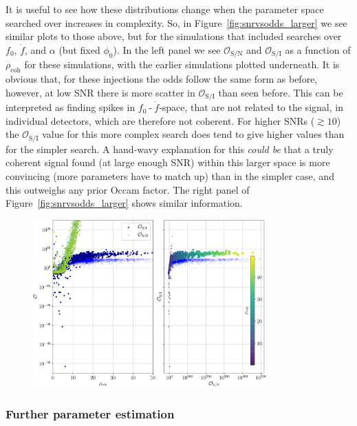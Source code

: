 It is useful to see how these distributions change when the parameter space searched over increases in complexity. So, in Figure~\ref{fig:snrvsodds_larger}
we see similar plots to those above, but for the simulations that included searches over $f_0$, $\dot{f}$, and $\alpha$ (but fixed $\phi_0$). In the left
panel we see $\mathcal{O}_{\text{S}/\text{N}}$ and $\mathcal{O}_{\text{S}/\text{I}}$ as a function of $\rho_{\text{coh}}$ for these simulations, with the
earlier simulations plotted underneath. It is obvious that, for these injections the odds follow the same form as before, however, at low SNR there
is more scatter in $\mathcal{O}_{\text{S}/\text{I}}$ than seen before. This can be interpreted as finding spikes in $f_0\operatorname{-}\dot{f}$-space, that
are not related to the signal, in individual detectors, which are therefore not coherent. For higher SNRs ($\gtrsim 10$) the $\mathcal{O}_{\text{S}/\text{I}}$
value for
this more complex search does tend to give higher values than for the simpler search. A hand-wavy explanation for this {\it could be} that a truly coherent signal
found (at large enough SNR) within this larger space is more convincing (more parameters have to match up) than in the simpler case, and this outweighs any
prior Occam factor. The right panel of Figure~\ref{fig:snrvsodds_larger} shows similar information.

\begin{figure}[phtb]
\begin{center}
\includegraphics[width=0.8\textwidth]{./figures/codeeval/stats/snr_vs_odds_larger/snr_v_odds_larger_plot}
\caption{ \protect}
\end{center}
\end{figure}

\subsubsection{Further parameter estimation}

